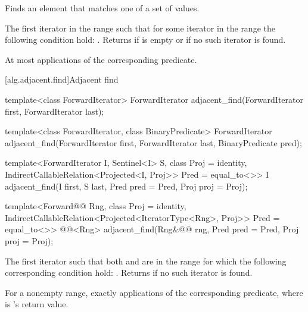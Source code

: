 \begin{itemdescr}
\pnum
\effects
Finds an element that matches one of a set of values.

\pnum
\returns
The first iterator
in the range 
such that for some
iterator
in the range 
the following condition hold:
.
Returns 
if  is empty or if
no such iterator is found.

\pnum
\complexity
At most
applications of the corresponding predicate.
\end{itemdescr}

[alg.adjacent.find]{Adjacent find}

%
\begin{removedblock}
\begin{itemdecl}
template<class ForwardIterator>
  ForwardIterator adjacent_find(ForwardIterator first, ForwardIterator last);

template<class ForwardIterator, class BinaryPredicate>
  ForwardIterator adjacent_find(ForwardIterator first, ForwardIterator last,
                              BinaryPredicate pred);
\end{itemdecl}
\end{removedblock}
\begin{addedblock}
\begin{itemdecl}
template<ForwardIterator I, Sentinel<I> S, class Proj = identity,
    IndirectCallableRelation<Projected<I, Proj>> Pred = equal_to<>>
  I
    adjacent_find(I first, S last, Pred pred = Pred{},
                  Proj proj = Proj{});

template<Forward@@ Rng, class Proj = identity,
    IndirectCallableRelation<Projected<IteratorType<Rng>, Proj>> Pred = equal_to<>>
  @@<Rng>
    adjacent_find(Rng&@\newtxt{\&}@ rng, Pred pred = Pred{}, Proj proj = Proj{});
\end{itemdecl}
\end{addedblock}

\begin{itemdescr}
\pnum
\returns
The first iterator
such that both
and
are in
the range
for which
the following corresponding condition hold:
.
Returns 
if no such iterator is found.

\pnum
\complexity
For a nonempty range, exactly
applications of the corresponding predicate, where  is
's
return value.
\end{itemdescr}

